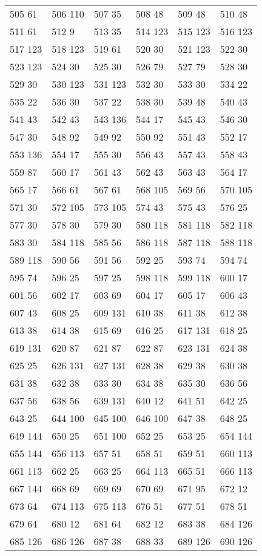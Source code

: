 \begin{longtable}{llllll}
505  61&506 110&507 35&508 48&509 48&510 48\\
511  61&512 9&513 35&514 123&515 123&516 123\\
517  123&518 123&519 61&520 30&521 123&522 30\\
523  123&524 30&525 30&526 79&527 79&528 30\\
529  30&530 123&531 123&532 30&533 30&534 22\\
535  22&536 30&537 22&538 30&539 48&540 43\\
541  43&542 43&543 136&544 17&545 43&546 30\\
547  30&548 92&549 92&550 92&551 43&552 17\\
553  136&554 17&555 30&556 43&557 43&558 43\\
559  87&560 17&561 43&562 43&563 43&564 17\\
565  17&566 61&567 61&568 105&569 56&570 105\\
571  30&572 105&573 105&574 43&575 43&576 25\\
577  30&578 30&579 30&580 118&581 118&582 118\\
583  30&584 118&585 56&586 118&587 118&588 118\\
589  118&590 56&591 56&592 25&593 74&594 74\\
595  74&596 25&597 25&598 118&599 118&600 17\\
601  56&602 17&603 69&604 17&605 17&606 43\\
607  43&608 25&609 131&610 38&611 38&612 38\\
613  38&614 38&615 69&616 25&617 131&618 25\\
619  131&620 87&621 87&622 87&623 131&624 38\\
625  25&626 131&627 131&628 38&629 38&630 38\\
631  38&632 38&633 30&634 38&635 30&636 56\\
637  56&638 56&639 131&640 12&641 51&642 25\\
643  25&644 100&645 100&646 100&647 38&648 25\\
649  144&650 25&651 100&652 25&653 25&654 144\\
655  144&656 113&657 51&658 51&659 51&660 113\\
661  113&662 25&663 25&664 113&665 51&666 113\\
667  144&668 69&669 69&670 69&671 95&672 12\\
673  64&674 113&675 113&676 51&677 51&678 51\\
679  64&680 12&681 64&682 12&683 38&684 126\\
685  126&686 126&687 38&688 33&689 126&690 126\\

\end{longtable}
